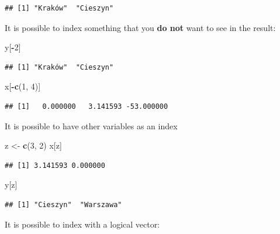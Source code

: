 \documentclass[
]{book}
\newenvironment{Shaded}{\begin{snugshade}}{\end{snugshade}}
\newcommand{\DecValTok}[1]{\textcolor[rgb]{0.00,0.00,0.81}{#1}}
\newcommand{\KeywordTok}[1]{\textcolor[rgb]{0.13,0.29,0.53}{\textbf{#1}}}
\newcommand{\NormalTok}[1]{#1}
\newcommand{\OperatorTok}[1]{\textcolor[rgb]{0.81,0.36,0.00}{\textbf{#1}}}
\newcommand{\StringTok}[1]{\textcolor[rgb]{0.31,0.60,0.02}{#1}}
\begin{document}
\begin{verbatim}
## [1] "Kraków"  "Cieszyn"
\end{verbatim}

It is possible to index something that you \textbf{do not} want to see in the result:

\begin{Shaded}
\begin{Highlighting}[]
\NormalTok{y[}\OperatorTok{-}\DecValTok{2}\NormalTok{]}
\end{Highlighting}
\end{Shaded}

\begin{verbatim}
## [1] "Kraków"  "Cieszyn"
\end{verbatim}

\begin{Shaded}
\begin{Highlighting}[]
\NormalTok{x[}\OperatorTok{-}\KeywordTok{c}\NormalTok{(}\DecValTok{1}\NormalTok{, }\DecValTok{4}\NormalTok{)]}
\end{Highlighting}
\end{Shaded}

\begin{verbatim}
## [1]   0.000000   3.141593 -53.000000
\end{verbatim}

It is possible to have other variables as an index

\begin{Shaded}
\begin{Highlighting}[]
\NormalTok{z <-}\StringTok{ }\KeywordTok{c}\NormalTok{(}\DecValTok{3}\NormalTok{, }\DecValTok{2}\NormalTok{)}
\NormalTok{x[z]}
\end{Highlighting}
\end{Shaded}

\begin{verbatim}
## [1] 3.141593 0.000000
\end{verbatim}

\begin{Shaded}
\begin{Highlighting}[]
\NormalTok{y[z]}
\end{Highlighting}
\end{Shaded}

\begin{verbatim}
## [1] "Cieszyn"  "Warszawa"
\end{verbatim}

It is possible to index with a logical vector:
\end{document}
